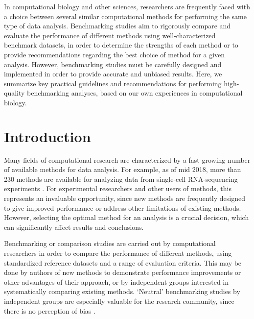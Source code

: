 \documentclass[12pt, a4paper]{article}
\begin{document}
In computational biology and other sciences, researchers are frequently faced with a choice between several similar computational methods for performing the same type of data analysis. Benchmarking studies aim to rigorously compare and evaluate the performance of different methods using well-characterized benchmark datasets, in order to determine the strengths of each method or to provide recommendations regarding the best choice of method for a given analysis. However, benchmarking studies must be carefully designed and implemented in order to provide accurate and unbiased results. Here, we summarize key practical guidelines and recommendations for performing high-quality benchmarking analyses, based on our own experiences in computational biology.




\section*{Introduction}

Many fields of computational research are characterized by a fast growing number of available methods for data analysis. For example, as of mid 2018, more than 230 methods are available for analyzing data from single-cell RNA-sequencing experiments \citep{Zappia2018}. For experimental researchers and other users of methods, this represents an invaluable opportunity, since new methods are frequently designed to give improved performance or address other limitations of existing methods. However, selecting the optimal method for an analysis is a crucial decision, which can significantly affect results and conclusions.

Benchmarking or comparison studies are carried out by computational researchers in order to compare the performance of different methods, using standardized reference datasets and a range of evaluation criteria. This may be done by authors of new methods to demonstrate performance improvements or other advantages of their approach, or by independent groups interested in systematically comparing existing methods. `Neutral' benchmarking studies by independent groups are especially valuable for the research community, since there is no perception of bias \citep{Boulesteix2018, Boulesteix2013}.
\end{document}
